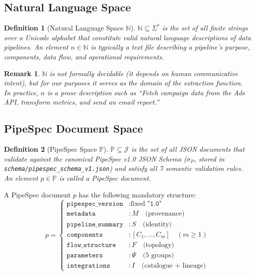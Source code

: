 \documentclass[11pt,a4paper]{article}
\newtheorem{definition}{Definition}[section]
\newtheorem{remark}{Remark}[section]
\theoremstyle{definition}
\newcommand{\nspace}{\mathbb{N}}
\newcommand{\pspace}{\mathbb{P}}
\newcommand{\jspace}{\mathcal{J}}
\begin{document}
\subsection{Natural Language Space}
\begin{definition}[Natural Language Space $\nspace$]
$\nspace \subseteq \Sigma^*$ is the set of all finite strings over a Unicode alphabet that constitute valid natural language descriptions of data pipelines. An element $n \in \nspace$ is typically a text file describing a pipeline's purpose, components, data flow, and operational requirements.
\end{definition}

\begin{remark}
$\nspace$ is not formally decidable (it depends on human communicative intent), but for our purposes it serves as the domain of the extraction function. In practice, $n$ is a prose description such as ``Fetch campaign data from the Ads API, transform metrics, and send an email report.''
\end{remark}

\subsection{PipeSpec Document Space}
\begin{definition}[PipeSpec Space $\pspace$]
$\pspace \subseteq \jspace$ is the set of all JSON documents that validate against the canonical PipeSpec v1.0 JSON Schema ($\sigma_P$, stored in \texttt{schema/pipespec\_schema\_v1.json}) and satisfy all 7 semantic validation rules. An element $p \in \pspace$ is called a \emph{PipeSpec document}.
\end{definition}

A PipeSpec document $p$ has the following mandatory structure:
\begin{equation}
p =
\begin{cases}
\texttt{pipespec\_version} &: \text{fixed } \texttt{"1.0"} \\
\texttt{metadata}          &: M \quad \text{(provenance)} \\
\texttt{pipeline\_summary} &: S \quad \text{(identity)} \\
\texttt{components}        &: [C_1, \dots, C_m] \quad (m \geq 1) \\
\texttt{flow\_structure}   &: F \quad \text{(topology)} \\
\texttt{parameters}        &: \Psi \quad \text{(5 groups)} \\
\texttt{integrations}      &: I \quad \text{(catalogue + lineage)}
\end{cases}
\end{equation}
\end{document}

